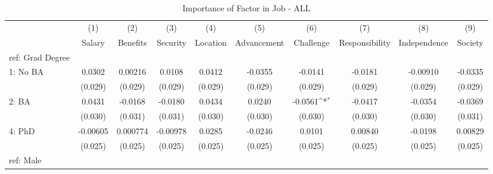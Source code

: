 \begin{table}[htbp]\centering
\def\sym#1{\ifmmode^{#1}\else\(^{#1}\)\fi}
\caption{Importance of Factor in Job - ALL \label{tab1}}
\begin{tabular}{l*{9}{c}}
\hline\hline
  &\multicolumn{1}{c}{(1)}&\multicolumn{1}{c}{(2)}&\multicolumn{1}{c}{(3)}&\multicolumn{1}{c}{(4)}&\multicolumn{1}{c}{(5)}&\multicolumn{1}{c}{(6)}&\multicolumn{1}{c}{(7)}&\multicolumn{1}{c}{(8)}&\multicolumn{1}{c}{(9)}\\
  &\multicolumn{1}{c}{Salary}&\multicolumn{1}{c}{Benefits}&\multicolumn{1}{c}{Security}&\multicolumn{1}{c}{Location}&\multicolumn{1}{c}{Advancement}&\multicolumn{1}{c}{Challenge}&\multicolumn{1}{c}{Responsibility}&\multicolumn{1}{c}{Independence}&\multicolumn{1}{c}{Society}\\
\hline
ref: Grad Degree&                     &                     &                     &                     &                     &                     &                     &                     &                     \\
[1em]
1: No BA&      0.0302         &     0.00216         &      0.0108         &      0.0412         &     -0.0355         &     -0.0141         &     -0.0181         &    -0.00910         &     -0.0335         \\
  &     (0.029)         &     (0.029)         &     (0.029)         &     (0.029)         &     (0.029)         &     (0.029)         &     (0.029)         &     (0.029)         &     (0.029)         \\
[1em]
2: BA&      0.0431         &     -0.0168         &     -0.0180         &      0.0434         &      0.0240         &     -0.0561\sym{*}  &     -0.0417         &     -0.0354         &     -0.0369         \\
  &     (0.030)         &     (0.031)         &     (0.031)         &     (0.030)         &     (0.030)         &     (0.030)         &     (0.030)         &     (0.030)         &     (0.031)         \\
[1em]
4: PhD&    -0.00605         &    0.000774         &    -0.00978         &      0.0285         &     -0.0246         &      0.0101         &     0.00840         &     -0.0198         &     0.00829         \\
  &     (0.025)         &     (0.025)         &     (0.025)         &     (0.025)         &     (0.025)         &     (0.025)         &     (0.025)         &     (0.025)         &     (0.025)         \\
[1em]
ref: Male&                     &                     &                     &                     &                     &                     &                     &                     &                     \\

\end{tabular}
\end{table}
